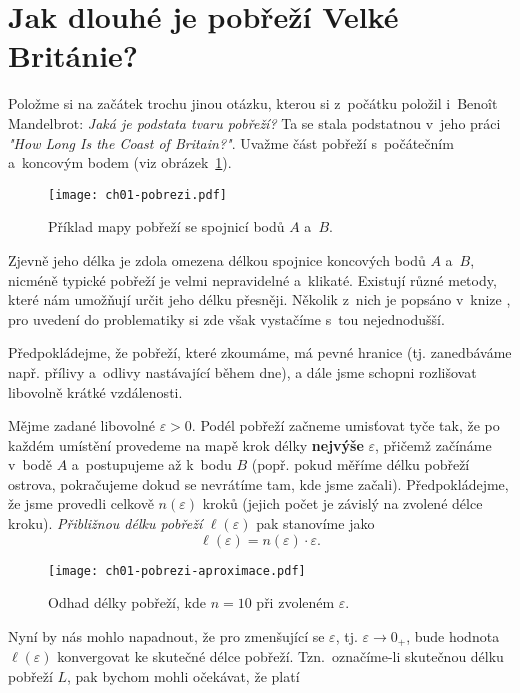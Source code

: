 \section{Jak dlouhé je pobřeží Velké Británie?}\label{sec:pobrezi_velke_britanie}
Položme si na začátek trochu jinou otázku, kterou si z~počátku položil i~Benoît Mandelbrot: \emph{Jaká je podstata tvaru pobřeží?} Ta se stala podstatnou v~jeho práci \emph{"How Long Is the Coast of Britain?"}. Uvažme část pobřeží s~počátečním a~koncovým bodem (viz obrázek~\ref{fig:pobrezi}).
\begin{figure}[h]
    \centering
    \texttt{[image: ch01-pobrezi.pdf]}
    \caption{Příklad mapy pobřeží se spojnicí bodů $A$ a~$B$.}
    \label{fig:pobrezi}
\end{figure}
Zjevně jeho délka je zdola omezena délkou spojnice koncových bodů $A$ a~$B$, nicméně typické pobřeží je velmi nepravidelné a~klikaté. Existují různé metody, které nám umožňují určit jeho délku přesněji. Několik z~nich je popsáno v~knize \citep[str. 79]{Mandelbrot1983}, pro uvedení do problematiky si zde však vystačíme s~tou nejednodušší.\par
Předpokládejme, že pobřeží, které zkoumáme, má pevné hranice (tj. zanedbáváme např. přílivy a~odlivy nastávající během dne), a dále jsme schopni rozlišovat libovolně krátké vzdálenosti.\par
Mějme zadané libovolné $\varepsilon>0$. Podél pobřeží začneme umisťovat tyče tak, že po každém umístění provedeme na mapě krok délky \textbf{nejvýše} $\varepsilon$, přičemž začínáme v~bodě $A$ a~postupujeme až k~bodu $B$ (popř. pokud měříme délku pobřeží ostrova, pokračujeme dokud se nevrátíme tam, kde jsme začali). Předpokládejme, že jsme provedli celkově $n(\varepsilon)$ kroků (jejich počet je závislý na zvolené délce kroku). \emph{Přibližnou délku pobřeží} $\ell(\varepsilon)$ pak stanovíme jako
\begin{equation*}
    \ell(\varepsilon)=n(\varepsilon)\cdot\varepsilon.
\end{equation*}
\begin{figure}[h]
    \centering
    \texttt{[image: ch01-pobrezi-aproximace.pdf]}
    \caption{Odhad délky pobřeží, kde $n=10$ při zvoleném $\varepsilon$.}
    \label{fig:pobrezi_aproximace}
\end{figure}
Nyní by nás mohlo napadnout, že pro zmenšující se $\varepsilon$, tj. $\varepsilon\to0_+$, bude hodnota $\ell(\varepsilon)$ konvergovat ke skutečné délce pobřeží. Tzn.~označíme-li skutečnou délku pobřeží $L$, pak bychom mohli očekávat, že platí
